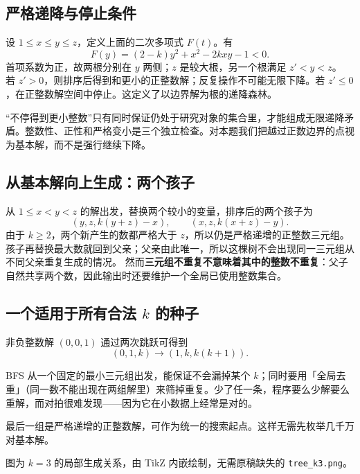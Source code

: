 \documentclass[UTF8,a4paper,11pt,twoside,openright,fontset=fandol]{ctexbook}
\theoremstyle{definition}
\begin{document}
\subsection{严格递降与停止条件}
设 $1\le x\le y\le z$，定义上面的二次多项式 $F(t)$。有
\[
 F(y)=(2-k)y^2+x^2-2kxy-1<0.
\]
首项系数为正，故两根分别在 $y$ 两侧；$z$ 是较大根，另一个根满足 $z'<y<z$。
若 $z'>0$，则排序后得到和更小的正整数解；反复操作不可能无限下降。若 $z'\le0$，在正整数解空间中停止。这定义了以边界解为根的递降森林。

\begin{pitfall}
“不停得到更小整数”只有同时保证仍处于研究对象的集合里，才能组成无限递降矛盾。整数性、正性和严格变小是三个独立检查。对本题我们把越过正数边界的点视为基本解，而不是强行继续下降。
\end{pitfall}

\subsection{从基本解向上生成：两个孩子}
从 $1\le x<y<z$ 的解出发，替换两个较小的变量，排序后的两个孩子为
\[
 (y,z,k(y+z)-x),\qquad (x,z,k(x+z)-y).
\]
由于 $k\ge2$，两个新产生的数都严格大于 $z$，所以仍是严格递增的正整数三元组。孩子再替换最大数就回到父亲；父亲由此唯一，所以这棵树不会出现同一三元组从不同父亲重复生成的情况。
然而\textbf{三元组不重复不意味着其中的整数不重复}：父子自然共享两个数，因此输出时还要维护一个全局已使用整数集合。

\subsection{一个适用于所有合法 \texorpdfstring{$k$}{k} 的种子}
非负整数解 $(0,0,1)$ 通过两次跳跃可得到
\[
 (0,1,k)\longrightarrow(1,k,k(k+1)).
\]

\begin{tip}
BFS 从一个固定的最小三元组出发，能保证不会漏掉某个 $k$；同时要用「全局去重」（同一数不能出现在两组解里）来筛掉重复。少了任一条，程序要么少解要么重解，而对拍很难发现——因为它在小数据上经常是对的。
\end{tip}

最后一组是严格递增的正整数解，可作为统一的搜索起点。这样无需先枚举几千万对基本解。

\begin{center}
\end{center}
图为 $k=3$ 的局部生成关系，由 TikZ 内嵌绘制，无需原稿缺失的 \texttt{tree\_k3.png}。
\end{document}
